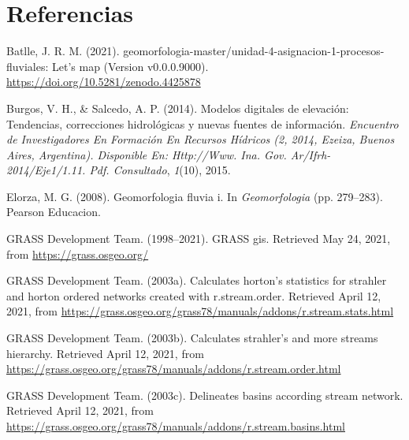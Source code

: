 \documentclass[11pt,]{article}
\newenvironment{Shaded}{\begin{snugshade}}{\end{snugshade}}
\newcommand{\KeywordTok}[1]{\textcolor[rgb]{0.13,0.29,0.53}{\textbf{#1}}}
\newcommand{\DataTypeTok}[1]{\textcolor[rgb]{0.13,0.29,0.53}{#1}}
\newcommand{\StringTok}[1]{\textcolor[rgb]{0.31,0.60,0.02}{#1}}
\newcommand{\OtherTok}[1]{\textcolor[rgb]{0.56,0.35,0.01}{#1}}
\newcommand{\OperatorTok}[1]{\textcolor[rgb]{0.81,0.36,0.00}{\textbf{#1}}}
\newcommand{\NormalTok}[1]{#1}
\begin{document}
\begin{Shaded}
\begin{Highlighting}[]
{\NormalTok{HypsoBasinsOrder3}\OperatorTok{$}\NormalTok{HypsoInt}
\NormalTok{HypsoBasinsOrder3}\OperatorTok{$}\NormalTok{HypsoCurve}
\KeywordTok{mapview}\NormalTok{(bas3, }\DataTypeTok{zcol=}\StringTok{'cat'}\NormalTok{, }\DataTypeTok{col.regions =} \StringTok{'blue'}\NormalTok{, }\DataTypeTok{legend =} \OtherTok{FALSE}\NormalTok{) }\OperatorTok{%
\StringTok{  }\KeywordTok{addStaticLabels}\NormalTok{(}\DataTypeTok{label =}\NormalTok{ bas3}\OperatorTok{$}\NormalTok{cat)}
\end{Highlighting}
\end{Shaded}

\section*{Referencias}\label{referencias}

\hypertarget{refs}{}
\hypertarget{ref-jose_ramon_martinez_batlle_2021}{}
Batlle, J. R. M. (2021).
geomorfologia-master/unidad-4-asignacion-1-procesos-fluviales: Let's map
(Version v0.0.0.9000). \url{https://doi.org/10.5281/zenodo.4425878}

\hypertarget{ref-burgos2014modelos}{}
Burgos, V. H., \& Salcedo, A. P. (2014). Modelos digitales de elevación:
Tendencias, correcciones hidrológicas y nuevas fuentes de información.
\emph{Encuentro de Investigadores En Formación En Recursos Hídricos (2,
2014, Ezeiza, Buenos Aires, Argentina). Disponible En: Http://Www. Ina.
Gov. Ar/Ifrh-2014/Eje1/1.11. Pdf. Consultado}, \emph{1}(10), 2015.

\hypertarget{ref-Gutierrez-Elorza}{}
Elorza, M. G. (2008). Geomorfologia fluvia i. In \emph{Geomorfologia}
(pp. 279--283). Pearson Educacion.

\hypertarget{ref-GrassGIS}{}
GRASS Development Team. (1998--2021). GRASS gis. Retrieved May 24, 2021,
from \url{https://grass.osgeo.org/}

\hypertarget{ref-addonrstreamstats}{}
GRASS Development Team. (2003a). Calculates horton's statistics for
strahler and horton ordered networks created with r.stream.order.
Retrieved April 12, 2021, from
\url{https://grass.osgeo.org/grass78/manuals/addons/r.stream.stats.html}

\hypertarget{ref-addonrstreamorder}{}
GRASS Development Team. (2003b). Calculates strahler's and more streams
hierarchy. Retrieved April 12, 2021, from
\url{https://grass.osgeo.org/grass78/manuals/addons/r.stream.order.html}

\hypertarget{ref-addonrstreambasins}{}
GRASS Development Team. (2003c). Delineates basins according stream
network. Retrieved April 12, 2021, from
\url{https://grass.osgeo.org/grass78/manuals/addons/r.stream.basins.html}
\end{document}
